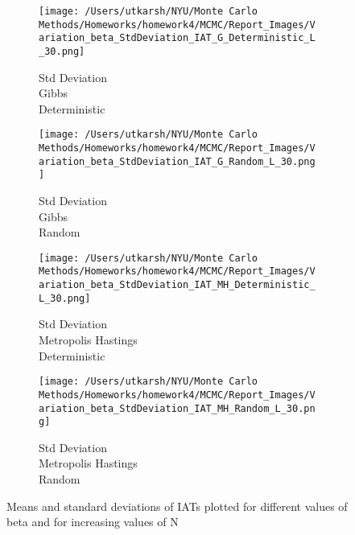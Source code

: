 \documentclass[11pt]{article}
\begin{document}
\begin{figure}[H]
	\begin{subfigure}{.23\textwidth}
		\texttt{[image: /Users/utkarsh/NYU/Monte Carlo Methods/Homeworks/homework4/MCMC/Report\_Images/Variation\_beta\_StdDeviation\_IAT\_G\_Deterministic\_L\_30.png]}
		\caption{Std Deviation\\Gibbs\\Deterministic}
	\end{subfigure}
	\begin{subfigure}{.23\textwidth}
		\texttt{[image: /Users/utkarsh/NYU/Monte Carlo Methods/Homeworks/homework4/MCMC/Report\_Images/Variation\_beta\_StdDeviation\_IAT\_G\_Random\_L\_30.png]}
		\caption{Std Deviation\\Gibbs\\Random}
	\end{subfigure}
	\begin{subfigure}{.23\textwidth}
		\texttt{[image: /Users/utkarsh/NYU/Monte Carlo Methods/Homeworks/homework4/MCMC/Report\_Images/Variation\_beta\_StdDeviation\_IAT\_MH\_Deterministic\_L\_30.png]}
		\caption{Std Deviation\\Metropolis Hastings\\Deterministic}
	\end{subfigure}
	\begin{subfigure}{.23\textwidth}
		\texttt{[image: /Users/utkarsh/NYU/Monte Carlo Methods/Homeworks/homework4/MCMC/Report\_Images/Variation\_beta\_StdDeviation\_IAT\_MH\_Random\_L\_30.png]}
		\caption{Std Deviation\\Metropolis Hastings\\Random}
	\end{subfigure}
	\caption{Means and standard deviations of IATs plotted for different values of beta and for increasing values of N}
	\label{fig:variation_with_betas}
\end{figure}
\end{document}
